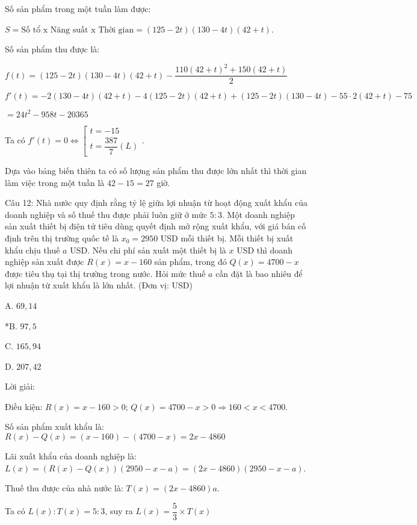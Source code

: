\documentclass[a4paper,12pt]{article}
\begin{document}
Số sản phẩm trong một tuần làm được:

\(S = \text{Số tổ x Năng suất x Thời gian} = \left(125 - 2 t\right)\left(130 - 4 t\right)(42 + t)\).

Số sản phẩm thu được là:

\(f(t) = \left(125 - 2 t\right)\left(130 - 4 t\right)(42 + t) - \dfrac{110(42 + t)^2 + 150(42 + t)}{2}\)

\(f'(t) = -2\left(130 - 4 t\right)(42 + t) - 4\left(125 - 2 t\right)(42 + t) + \left(125 - 2 t\right)\left(130 - 4 t\right) - 55 \cdot 2(42 + t) - 75\)

\(= 24t^{2} - 958t - 20365\)

Ta có \(f'(t) = 0 \Leftrightarrow \left[\begin{array}{l}t = -15 \\ t = \dfrac{387}{7}(L)\end{array}\right.\).

Dựa vào bảng biến thiên ta có số lượng sản phẩm thu được lớn nhất thì thời gian làm việc trong một tuần là \(42 - 15 = 27\) giờ.




Câu 12: Nhà nước quy định rằng tỷ lệ giữa lợi nhuận từ hoạt động xuất khẩu của doanh nghiệp và số thuế thu được phải luôn giữ ở mức \(5 : 3\). Một doanh nghiệp sản xuất thiết bị điện tử tiêu dùng quyết định mở rộng xuất khẩu, với giá bán cố định trên thị trường quốc tế là \(x_0 = 2950\) USD mỗi thiết bị. Mỗi thiết bị xuất khẩu chịu thuế \(a\) USD. Nếu chi phí sản xuất một thiết bị là \(x\) USD thì doanh nghiệp sản xuất được \(R(x) = x - 160\) sản phẩm, trong đó \(Q(x) = 4700 - x\) được tiêu thụ tại thị trường trong nước. Hỏi mức thuế \(a\) cần đặt là bao nhiêu để lợi nhuận từ xuất khẩu là lớn nhất. (Đơn vị: USD)

A. \(69,14\)

*B. \(97,5\)

C. \(165,94\)

D. \(207,42\)

Lời giải:


Điều kiện: \(R(x) = x - 160 > 0\); \(Q(x) = 4700 - x > 0 \Rightarrow 160 < x < 4700\).

Số sản phẩm xuất khẩu là: \(R(x) - Q(x) = (x - 160) - (4700 - x) = 2x - 4860\)

Lãi xuất khẩu của doanh nghiệp là: \(L(x) = (R(x) - Q(x))(2950 - x - a) = (2x - 4860)(2950 - x - a)\).

Thuế thu được của nhà nước là: \(T(x) = (2x - 4860)a\).

Ta có \(L(x) : T(x) = 5 : 3\), suy ra \(L(x) = \dfrac{5}{3} \times T(x)\)
\end{document}
